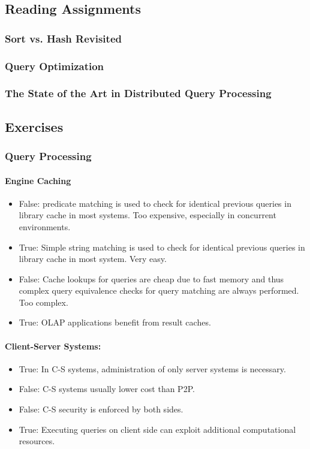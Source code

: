 \subsection{Reading Assignments}

\subsubsection{Sort vs. Hash Revisited}

\subsubsection{Query Optimization}

\subsubsection{The State of the Art in Distributed Query Processing}








\subsection{Exercises}

\subsubsection{Query Processing}

\paragraph{Engine Caching}
\begin{itemize}
    \item False: predicate matching is used to check for identical previous queries in library cache in most systems. Too expensive, especially in concurrent environments.
    \item True: Simple string matching is used to check for identical previous queries in library cache in most system. Very easy.
    \item False: Cache lookups for queries are cheap due to fast memory and thus complex query equivalence checks for query matching are always performed. Too complex.
    \item True: OLAP applications benefit from result caches. 
\end{itemize}

\paragraph{Client-Server Systems:}
\begin{itemize}
    \item True: In C-S systems, administration of only server systems is necessary.
    \item False: C-S systems usually lower cost than P2P.
    \item False: C-S security is enforced by both sides.
    \item True: Executing queries on client side can exploit additional computational resources.
\end{itemize}

